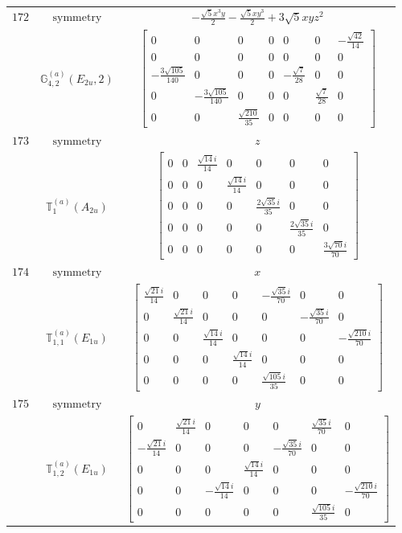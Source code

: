\documentclass[fleqn,8pt,landscape]{jsarticle}
\begin{document}
\begin{longtable}{ccc}
$ 172 $ & $ \text{symmetry} $ & $ - \frac{\sqrt{5} x^{3} y}{2} - \frac{\sqrt{5} x y^{3}}{2} + 3 \sqrt{5} x y z^{2} $ \\
$  $ & $ \mathbb{G}_{4,2}^{(a)}(E_{2u},2) $ & $ \begin{bmatrix} 0 & 0 & 0 & 0 & 0 & 0 & - \frac{\sqrt{42}}{14} \\ 0 & 0 & 0 & 0 & 0 & 0 & 0 \\ - \frac{3 \sqrt{105}}{140} & 0 & 0 & 0 & - \frac{\sqrt{7}}{28} & 0 & 0 \\ 0 & - \frac{3 \sqrt{105}}{140} & 0 & 0 & 0 & \frac{\sqrt{7}}{28} & 0 \\ 0 & 0 & \frac{\sqrt{210}}{35} & 0 & 0 & 0 & 0 \end{bmatrix} $ \\ \hline
$ 173 $ & $ \text{symmetry} $ & $ z $ \\
$  $ & $ \mathbb{T}_{1}^{(a)}(A_{2u}) $ & $ \begin{bmatrix} 0 & 0 & \frac{\sqrt{14} i}{14} & 0 & 0 & 0 & 0 \\ 0 & 0 & 0 & \frac{\sqrt{14} i}{14} & 0 & 0 & 0 \\ 0 & 0 & 0 & 0 & \frac{2 \sqrt{35} i}{35} & 0 & 0 \\ 0 & 0 & 0 & 0 & 0 & \frac{2 \sqrt{35} i}{35} & 0 \\ 0 & 0 & 0 & 0 & 0 & 0 & \frac{3 \sqrt{70} i}{70} \end{bmatrix} $ \\ \hline
$ 174 $ & $ \text{symmetry} $ & $ x $ \\
$  $ & $ \mathbb{T}_{1,1}^{(a)}(E_{1u}) $ & $ \begin{bmatrix} \frac{\sqrt{21} i}{14} & 0 & 0 & 0 & - \frac{\sqrt{35} i}{70} & 0 & 0 \\ 0 & \frac{\sqrt{21} i}{14} & 0 & 0 & 0 & - \frac{\sqrt{35} i}{70} & 0 \\ 0 & 0 & \frac{\sqrt{14} i}{14} & 0 & 0 & 0 & - \frac{\sqrt{210} i}{70} \\ 0 & 0 & 0 & \frac{\sqrt{14} i}{14} & 0 & 0 & 0 \\ 0 & 0 & 0 & 0 & \frac{\sqrt{105} i}{35} & 0 & 0 \end{bmatrix} $ \\ \hline
$ 175 $ & $ \text{symmetry} $ & $ y $ \\
$  $ & $ \mathbb{T}_{1,2}^{(a)}(E_{1u}) $ & $ \begin{bmatrix} 0 & \frac{\sqrt{21} i}{14} & 0 & 0 & 0 & \frac{\sqrt{35} i}{70} & 0 \\ - \frac{\sqrt{21} i}{14} & 0 & 0 & 0 & - \frac{\sqrt{35} i}{70} & 0 & 0 \\ 0 & 0 & 0 & \frac{\sqrt{14} i}{14} & 0 & 0 & 0 \\ 0 & 0 & - \frac{\sqrt{14} i}{14} & 0 & 0 & 0 & - \frac{\sqrt{210} i}{70} \\ 0 & 0 & 0 & 0 & 0 & \frac{\sqrt{105} i}{35} & 0 \end{bmatrix} $ \\ \hline

\end{longtable}
\end{document}
